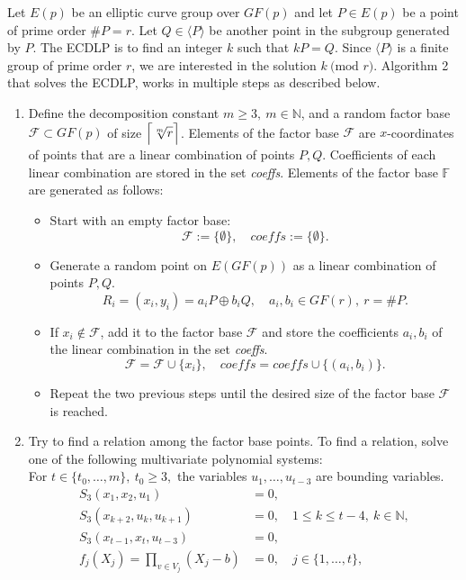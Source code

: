 \documentclass[thesis=M,english]{FITthesis}[2012/10/20]
\theoremstyle{remark}
\theoremstyle{definition}
\begin{document}
\noindent Let $E(p)$ be an elliptic curve group over $GF(p)$ and let $P \in E(p)$ be a point of prime order $\#P = r$. Let $Q \in \langle P \rangle$ be another point in the subgroup generated by $P$. The ECDLP is to find an integer $k$ such that $kP = Q.$ Since $\langle P \rangle$ is a finite group of prime order $r$, we are interested in the solution $k\ \text{(mod }r)$.  Algorithm 2 that solves the ECDLP, works in multiple steps as described below.
\begin{enumerate}
\item Define the decomposition constant $m \geq 3,\ m \in \mathbb{N}$, and a random factor base $\mathcal{F} \subset GF(p)$ of size $\mathlarger{\Big\lceil \sqrt[m]{r} \Big\rceil}$. Elements of the factor base $\mathcal{F}$ are $x$-coordinates of points that are a linear combination of points $P,Q$. Coefficients of each linear combination are stored in the set \textit{coeffs}. Elements of the factor base $\mathbb{F}$ are generated as follows:
\begin{itemize}
\item Start with an empty factor base:
$$
\mathcal{F} := \{\emptyset \}, \quad \textit{coeffs} := \{\emptyset \}.
$$
\item Generate a random point on $E(GF(p))$ as a linear combination of points $P,Q$.
$$
R_i = (x_i, y_i) = a_iP \oplus b_iQ, \quad a_i,b_i \in GF(r),\ r = \#P.
$$
\item If $x_i \not\in \mathcal{F}$, add it to the factor base $\mathcal{F}$ and store the coefficients $a_i,b_i$ of the linear combination in the set \textit{coeffs}.
$$
\mathcal{F} = \mathcal{F} \cup \{x_i\},\quad \textit{coeffs} = \textit{coeffs} \cup \{(a_i, b_i)\}.
$$
\item Repeat the two previous steps until the desired size of the factor base $\mathcal{F}$ is reached.
\end{itemize}
\item Try to find a relation among the factor base points. To find a relation, solve one of the following multivariate polynomial systems: \\
For $t \in \{t_0, \ldots, m\},\ t_0 \geq 3,$ the variables $u_1,\ldots, u_{t - 3}$ are bounding variables.
\begin{align*}
S_3(x_1,x_2,u_1) &= 0, \\
S_3(x_{k+2},u_k,u_{k+1}) &= 0,\quad 1 \leq k \leq t - 4,\ k \in \mathbb{N}, \\
S_3(x_{t-1},x_{t},u_{t-3}) &= 0, \\
f_j(X_j) = \prod_{v \in V_j}(X_j - b) &= 0, \quad j \in \{1, \ldots, t\},

\end{align*}
\end{enumerate}
\end{document}
